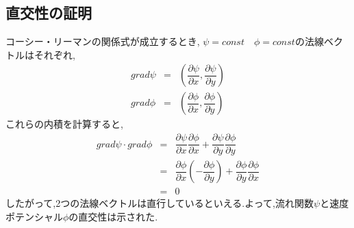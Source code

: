 \documentclass[a4paper]{jsarticle}
\begin{document}
\subsection{直交性の証明}
コーシー・リーマンの関係式が成立するとき,
$\psi=const\quad \phi=const$の法線ベクトルはそれぞれ,
\begin{eqnarray*}
    grad \psi&=&\left(\dfrac{\partial \psi}{\partial x}, \dfrac{\partial \psi}{\partial y}\right)\\
    grad \phi&=&\left(\dfrac{\partial \phi}{\partial x}, \dfrac{\partial \phi}{\partial y}\right)
\end{eqnarray*}
これらの内積を計算すると,
\begin{eqnarray*}
    grad\psi \cdot grad\phi &=& \dfrac{\partial \psi}{\partial x}\dfrac{\partial \phi}{\partial x} +\dfrac{\partial \psi}{\partial y}\dfrac{\partial \phi}{\partial y}\\
    &=&\dfrac{\partial \phi}{\partial x}\left(-\dfrac{\partial \phi}{\partial y}\right)+\dfrac{\partial \phi}{\partial y}\dfrac{\partial \phi}{\partial x}\\
    &=&0
\end{eqnarray*}
したがって,2つの法線ベクトルは直行しているといえる.よって,流れ関数$\psi$と速度ポテンシャル$\phi$の直交性は示された.
\end{document}
